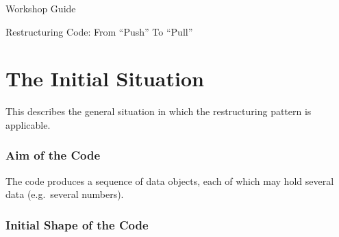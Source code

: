 \documentclass[a4paper,fleqn,titlepage,11pt]{article}
\begin{document}
\thispagestyle{empty}

\begin{center}
\LARGE
Workshop Guide

\vspace{1cm}

Restructuring Code: From ``Push''  To ``Pull''
\end{center}

\normalsize

\vspace{0.6cm}



\section{The Initial Situation}

This describes the general situation in which the restructuring pattern is applicable.

\subsubsection*{Aim of the Code}

The code produces a sequence of data objects, each of which may hold several data (e.g.~several numbers).

\subsubsection*{Initial Shape of the Code}
\end{document}
